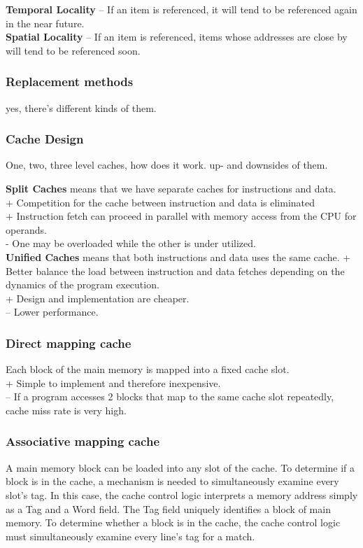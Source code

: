 \textbf{Temporal Locality} -- If an item is referenced, it will tend to be referenced again in the near future. \\
\textbf{Spatial Locality} -- If an item is referenced, items whose addresses are close by will tend to be referenced soon. \\

\subsubsection{Replacement methods}
yes, there's different kinds of them.

\subsubsection{Cache Design}

One, two, three level caches, how does it work. up- and downsides of them.

\textbf{Split Caches} means that we have separate caches for instructions and data. \\
+ Competition for the cache between instruction and data is eliminated \\
+ Instruction fetch can proceed in parallel with memory access from the CPU for operands. \\
- One may be overloaded while the other is under utilized. \\

\textbf{Unified Caches} means that both instructions and data uses the same cache.
+ Better balance the load between instruction and data fetches depending on the dynamics of the program execution. \\
+ Design and implementation are cheaper. \\
-- Lower performance. \\
\subsubsection{Direct mapping cache}
Each block of the main memory is mapped into a fixed cache slot. \\
+ Simple to implement and therefore inexpensive. \\
-- If a program accesses 2 blocks that map to the same cache slot repeatedly, cache miss rate is very high. \\

\subsubsection{Associative mapping cache}
A main memory block can be loaded into any slot of the cache. To determine if a block is in the cache, a mechanism is needed to simultaneously examine every slot’s tag. In this case, the cache control logic interprets a memory address simply as a Tag and a Word field. The Tag field uniquely identifies a block of main memory. To determine whether a block is in the cache, the cache control logic must simultaneously examine every line’s tag for a match. \\

